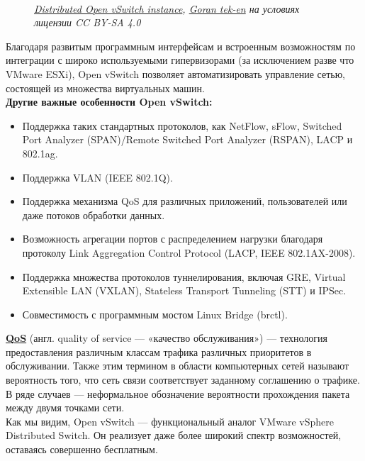 \documentclass[14pt, a4paper]{article}
\begin{document}
\begin{figure}[h]
    \centering
     \\
    \small\textit{\href{https://commons.wikimedia.org/wiki/File:Distributed_Open_vSwitch_instance.svg}{Distributed Open vSwitch instance}, \href{https://commons.wikimedia.org/wiki/User:Goran_tek-en}{Goran tek-en} на условиях лицензии CC BY-SA 4.0} 
    \label{framework} 
\end{figure}

Благодаря развитым программным интерфейсам и встроенным возможностям по интеграции с
широко используемыми гипервизорами (за исключением разве что VMware ESXi), Open vSwitch
позволяет автоматизировать управление сетью, состоящей из множества виртуальных машин.\\

\textbf{Другие важные особенности Open vSwitch:}
\begin{itemize}
    \item Поддержка таких стандартных протоколов, как NetFlow, sFlow, Switched Port Analyzer
    (SPAN)/Remote Switched Port Analyzer (RSPAN), LACP и 802.1ag.
    \item Поддержка VLAN (IEEE 802.1Q).
    \item Поддержка механизма QoS для различных приложений, пользователей или даже потоков
    обработки данных.
    \item Возможность агрегации портов с распределением нагрузки благодаря протоколу Link
    Aggregation Control Protocol (LACP, IEEE 802.1AX-2008).
    \item Поддержка множества протоколов туннелирования, включая GRE, Virtual Extensible LAN
    (VXLAN), Stateless Transport Tunneling (STT) и IPSec.
    \item Совместимость с программным мостом Linux Bridge (brctl).
\end{itemize}

\href{https://ru.wikipedia.org/wiki/QoS}{\textbf{QoS}} (англ. quality of service — «качество обслуживания») — технология предоставления различным
классам трафика различных приоритетов в обслуживании. Также этим термином в области
компьютерных сетей называют вероятность того, что сеть связи соответствует заданному соглашению
о трафике. В ряде случаев — неформальное обозначение вероятности прохождения пакета между
двумя точками сети.\\

Как мы видим, Open vSwitch — функциональный аналог VMware vSphere Distributed Switch. Он
реализует даже более широкий спектр возможностей, оставаясь совершенно бесплатным.\\
\end{document}
